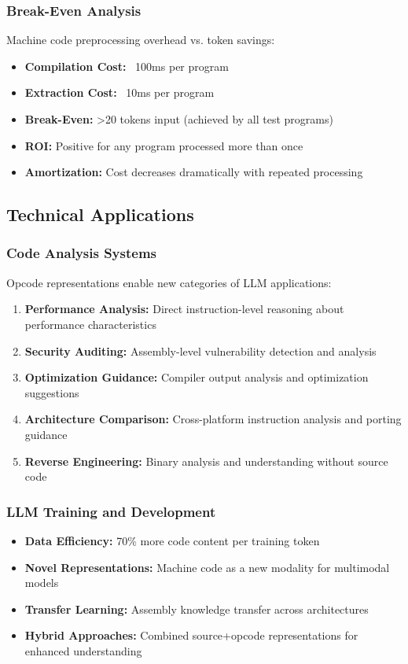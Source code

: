 \documentclass[11pt,a4paper]{article}
\begin{document}
\subsubsection{Break-Even Analysis}
Machine code preprocessing overhead vs. token savings:
\begin{itemize}
    \item \textbf{Compilation Cost:} ~100ms per program
    \item \textbf{Extraction Cost:} ~10ms per program  
    \item \textbf{Break-Even:} >20 tokens input (achieved by all test programs)
    \item \textbf{ROI:} Positive for any program processed more than once
    \item \textbf{Amortization:} Cost decreases dramatically with repeated processing
\end{itemize}

\subsection{Technical Applications}

\subsubsection{Code Analysis Systems}
Opcode representations enable new categories of LLM applications:
\begin{enumerate}
    \item \textbf{Performance Analysis:} Direct instruction-level reasoning about performance characteristics
    \item \textbf{Security Auditing:} Assembly-level vulnerability detection and analysis
    \item \textbf{Optimization Guidance:} Compiler output analysis and optimization suggestions
    \item \textbf{Architecture Comparison:} Cross-platform instruction analysis and porting guidance
    \item \textbf{Reverse Engineering:} Binary analysis and understanding without source code
\end{enumerate}

\subsubsection{LLM Training and Development}
\begin{itemize}
    \item \textbf{Data Efficiency:} 70\% more code content per training token
    \item \textbf{Novel Representations:} Machine code as a new modality for multimodal models
    \item \textbf{Transfer Learning:} Assembly knowledge transfer across architectures
    \item \textbf{Hybrid Approaches:} Combined source+opcode representations for enhanced understanding
\end{itemize}
\end{document}
